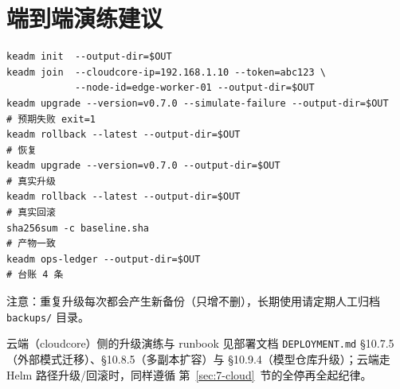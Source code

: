 \section{端到端演练建议}

\begin{lstlisting}
keadm init  --output-dir=$OUT
keadm join  --cloudcore-ip=192.168.1.10 --token=abc123 \
            --node-id=edge-worker-01 --output-dir=$OUT
keadm upgrade --version=v0.7.0 --simulate-failure --output-dir=$OUT   # 预期失败 exit=1
keadm rollback --latest --output-dir=$OUT                             # 恢复
keadm upgrade --version=v0.7.0 --output-dir=$OUT                      # 真实升级
keadm rollback --latest --output-dir=$OUT                             # 真实回滚
sha256sum -c baseline.sha                                             # 产物一致
keadm ops-ledger --output-dir=$OUT                                    # 台账 4 条
\end{lstlisting}

注意：重复升级每次都会产生新备份（只增不删），长期使用请定期人工归档
\texttt{backups/} 目录。

云端（cloudcore）侧的升级演练与 runbook 见部署文档
\texttt{DEPLOYMENT.md} §10.7.5（外部模式迁移）、§10.8.5（多副本扩容）与
§10.9.4（模型仓库升级）；云端走 Helm 路径升级/回滚时，同样遵循
第~\ref{sec:7-cloud}~节的全停再全起纪律。
